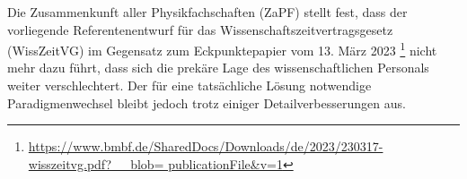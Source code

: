 \documentclass[DIV=calc]{scrartcl}
\begin{document}




Die Zusammenkunft aller Physikfachschaften (ZaPF) stellt
fest, dass der vorliegende Referentenentwurf für das Wissenschaftszeitvertragsgesetz (WissZeitVG) im Gegensatz zum Eckpunktepapier vom 13. März 2023 \footnote{\href{https://www.bmbf.de/SharedDocs/Downloads/de/2023/230317-wisszeitvg.pdf?__blob=publicationFile&v=1}{https://www.bmbf.de/SharedDocs/Downloads/de/2023/230317-wisszeitvg.pdf?\_\_blob= publicationFile\&v=1}} nicht mehr dazu führt, dass sich die prekäre Lage des wissenschaftlichen Personals weiter verschlechtert. Der für eine tatsächliche Lösung notwendige Paradigmenwechsel bleibt jedoch trotz einiger Detailverbesserungen aus.
\end{document}

